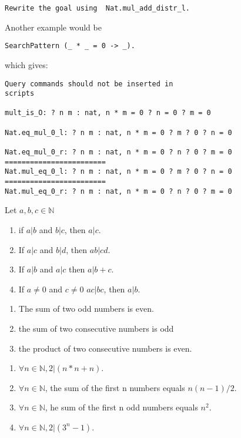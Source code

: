 \documentclass[11pt, oneside]{article}   	%
\begin{document}
  \begin{verbatim}
Rewrite the goal using  Nat.mul_add_distr_l.
 \end{verbatim}

Another example would be
\begin{verbatim}
SearchPattern (_ * _ = 0 -> _).
\end{verbatim}
which gives:

\begin{verbatim}
Query commands should not be inserted in
scripts

mult_is_O: ? n m : nat, n * m = 0 ? n = 0 ? m = 0

Nat.eq_mul_0_l: ? n m : nat, n * m = 0 ? m ? 0 ? n = 0

Nat.eq_mul_0_r: ? n m : nat, n * m = 0 ? n ? 0 ? m = 0
========================
Nat.mul_eq_0_l: ? n m : nat, n * m = 0 ? m ? 0 ? n = 0
========================
Nat.mul_eq_0_r: ? n m : nat, n * m = 0 ? n ? 0 ? m = 0
\end{verbatim}


\begin{lemma} Let $a,b,c \in \mathbb{N}$
\begin{enumerate}

\item  if $a | b$ and $b | c$, then $a | c$.
\item If $a | c$ and $b | d$, then $ab | cd$.
\item If   $a | b $ and $a | c$  then $a | b+c$.
\item If $a \ne  0$ and $c \ne 0$ $ac | bc$, then $a | b$.
\end{enumerate}

\end{lemma}

\begin{lemma}
\begin{enumerate}

\item The sum of two odd numbers is even.
\item the sum of two consecutive numbers is odd
\item the product of two consecutive numbers is even.


\end{enumerate}

\end{lemma}


\begin{lemma}

\begin{enumerate} 
\item $\forall n \in \mathbb{N},  2 | (n * n + n)$.
\item $\forall n \in \mathbb{N}$, the sum of the first n numbers equals $n(n-1)/2$.
\item $\forall n \in \mathbb{N}$, he sum of the first n odd numbers equals $n^2$.
\item $\forall n \in \mathbb{N}, 2 | (3^n - 1)$.



\end{enumerate}

\end{lemma}
\end{document}
